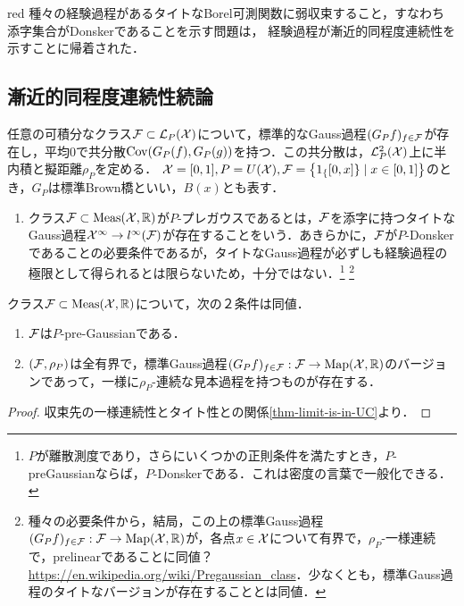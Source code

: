 \documentclass[uplatex,dvipdfmx]{jsreport}
\begin{document}
\begin{tbox}{red}{}
    種々の経験過程があるタイトなBorel可測関数に弱収束すること，すなわち添字集合がDonskerであることを示す問題は，
    経験過程が漸近的同程度連続性を示すことに帰着された．
\end{tbox}

\subsection{漸近的同程度連続性続論}

\begin{tcolorbox}[colframe=ForestGreen, colback=ForestGreen!10!white,breakable,colbacktitle=ForestGreen!40!white,coltitle=black,fonttitle=\bfseries\sffamily,
title=]
    任意の可積分なクラス$\mathcal{F}\subset\mathcal{L}_P(\mathcal{X})$について，標準的なGauss過程$(G_Pf)_{f\in\mathcal{F}}$が存在し，平均$0$で共分散$\mathrm{Cov}(G_P(f),G_P(g))$を持つ．この共分散は，$\mathcal{L}^2_P(\mathcal{X})$上に半内積と擬距離$\rho_P$を定める．
    $\mathcal{X}=[0,1],P=U(\mathcal{X}),\mathcal{F}=\left\{1_\{[0,x]\}\mid x\in[0,1]\right\}$のとき，$G_P$は標準Brown橋といい，$B(x)$とも表す．
\end{tcolorbox}

\begin{definition}\mbox{}
    \begin{enumerate}
        \item クラス$\mathcal{F}\subset\mathrm{Meas}(\mathcal{X},\mathbb{R})$が$P$-プレガウスであるとは，$\mathcal{F}$を添字に持つタイトなGauss過程$\mathcal{X}^\infty\to l^\infty(\mathcal{F})$が存在することをいう．あきらかに，$\mathcal{F}$が$P$-Donskerであることの必要条件であるが，タイトなGauss過程が必ずしも経験過程の極限として得られるとは限らないため，十分ではない．\footnote{$P$が離散測度であり，さらにいくつかの正則条件を満たすとき，$P$-preGaussianならば，$P$-Donskerである．これは密度の言葉で一般化できる．}
        \footnote{種々の必要条件から，結局，この上の標準Gauss過程$(G_Pf)_{f\in\mathcal{F}}:\mathcal{F}\to\mathrm{Map}(\mathcal{X},\mathbb{R})$が，各点$x\in\mathcal{X}$について有界で，$\rho_P$-一様連続で，prelinearであることに同値？\url{https://en.wikipedia.org/wiki/Pregaussian_class}．少なくとも，標準Gauss過程のタイトなバージョンが存在することとは同値\cite{van der Vaart and Wellner}．}
    \end{enumerate}
\end{definition}

\begin{lemma}
    クラス$\mathcal{F}\subset\mathrm{Meas}(\mathcal{X},\mathbb{R})$について，次の２条件は同値．
    \begin{enumerate}
        \item $\mathcal{F}$は$P$-pre-Gaussianである．
        \item $(\mathcal{F},\rho_P)$は全有界で，標準Gauss過程$(G_Pf)_{f\in\mathcal{F}}:\mathcal{F}\to\mathrm{Map}(\mathcal{X},\mathbb{R})$のバージョンであって，一様に$\rho_P$-連続な見本過程を持つものが存在する．
    \end{enumerate}
\end{lemma}
\begin{proof}
    収束先の一様連続性とタイト性との関係\ref{thm-limit-is-in-UC}より．
\end{proof}
\end{document}
